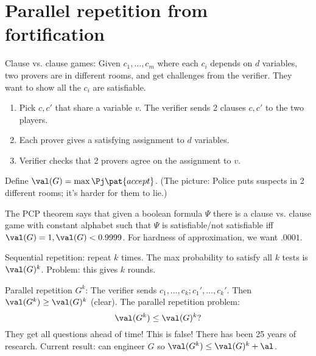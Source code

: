 \def\filepath{C:/Users/Owner/Dropbox/Math/templates}





%


%

\pagestyle{fancy}
\chead{} 
\lfoot{} 
\cfoot{\thepage} 
\rfoot{} 
\renewcommand{\headrulewidth}{.3pt} 
\setlength\voffset{0in}
\setlength\textheight{648pt}


\section{Parallel repetition from fortification}
Clause vs. clause games: Given $c_1,\ldots, c_m$ where each $c_i$ depends on $d$ variables, two provers are in different rooms, and get challenges from the verifier. They want to show all the $c_i$ are satisfiable. 
\begin{enumerate}
\item Pick $c,c'$ that share a variable $v$.  The verifier sends 2 clauses $c,c'$ to the two players.
\item
Each prover gives a satisfying assignment to $d$ variables.
\item Verifier checks that 2 provers agree on the assignment to $v$.
\end{enumerate}
Define $\val(G)=\max \Pj\pat{accept}$.
(The picture: Police puts suspects in 2 different rooms; it's harder for them to lie.)

The PCP theorem says that given a boolean formula $\Psi$ there is a clause vs. clause game with constant alphabet such that $\Psi$ is satisfiable/not satisfiable iff $\val(G)=1, \val(G)<0.9999$. For hardness of approximation, we want $.0001$.

Sequential repetition: repeat $k$ times. The max probability to satisfy all $k$ tests is $\val(G)^k$. Problem: this gives $k$ rounds.

Parallel repetition $G^k$: The verifier sends $c_1,\ldots, c_k;c_1',\ldots, c_k'$. Then $\val(G^k)\ge \val(G)^k$ (clear). The parallel repetition problem:
\[
\val(G^k)\le \val(G)^k?
\]
They get all questions ahead of time! This is false! There has been 25 years of research. 
Current result: can engineer $G$ so $\val(G^k)\le \val(G)^k+\al$.

